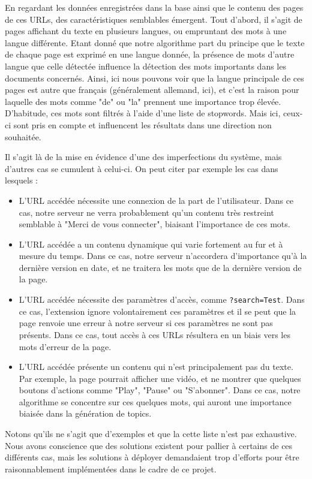 				En regardant les données enregistrées dans la base ainsi que le contenu des pages de ces URLs, des caractéristiques semblables émergent. Tout d'abord, il s'agit de pages affichant du texte en plusieurs langues, ou empruntant des mots à une langue différente. Etant donné que notre algorithme part du principe que le texte de chaque page est exprimé en une langue donnée, la présence de mots d'autre langue que celle détectée influence la détection des mots importants dans les documents concernés. Ainsi, ici nous pouvons voir que la langue principale de ces pages est autre que français (généralement allemand, ici), et c'est la raison pour laquelle des mots comme "de" ou "la" prennent une importance trop élevée. D'habitude, ces mots sont filtrés à l'aide d'une liste de stopwords. Mais ici, ceux-ci sont pris en compte et influencent les résultats dans une direction non souhaitée.

				Il s'agit là de la mise en évidence d'une des imperfections du système, mais d'autres cas se cumulent à celui-ci. On peut citer par exemple les cas dans lesquels :
				\begin{itemize}
					\item L'URL accédée nécessite une connexion de la part de l'utilisateur. Dans ce cas, notre serveur ne verra probablement qu'un contenu très restreint semblable à "Merci de vous connecter", biaisant l'importance de ces mots.
					\item L'URL accédée a un contenu dynamique qui varie fortement au fur et à mesure du temps. Dans ce cas, notre serveur n'accordera d'importance qu'à la dernière version en date, et ne traitera les mots que de la dernière version de la page.
					\item L'URL accédée nécessite des paramètres d'accès, comme \texttt{?search=Test}. Dans ce cas, l'extension ignore volontairement ces paramètres et il se peut que la page renvoie une erreur à notre serveur si ces paramètres ne sont pas présents. Dans ce cas, tout accès à ces URLs résultera en un biais vers les mots d'erreur de la page.
					\item L'URL accédée présente un contenu qui n'est principalement pas du texte. Par exemple, la page pourrait afficher une vidéo, et ne montrer que quelques boutons d'actions comme "Play", "Pause" ou "S'abonner". Dans ce cas, notre algorithme se concentre sur ces quelques mots, qui auront une importance biaisée dans la génération de topics. 
				\end{itemize}
				Notons qu'ils ne s'agit que d'exemples et que la cette liste n'est pas exhaustive. Nous avons conscience que des solutions existent pour pallier à certains de ces différents cas, mais les solutions à déployer demandaient trop d'efforts pour être raisonnablement implémentées dans le cadre de ce projet.

